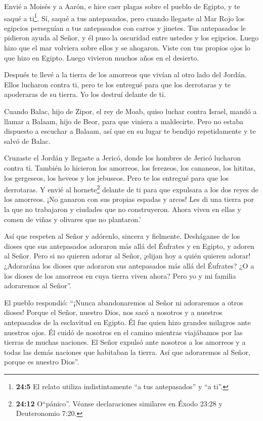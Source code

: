  Envié a Moisés y a Aarón, e hice caer plagas sobre el
pueblo de Egipto, y te saqué a ti\footnote{\textbf{24:5} El relato
  utiliza indistintamente ``a tus antepasados'' y ``a ti''.}.
 Sí, saqué a tus antepasados, pero cuando llegaste al Mar
Rojo los egipcios perseguían a tus antepasados con carros y jinetes.
 Tus antepasados le pidieron ayuda al Señor, y él puso la
oscuridad entre ustedes y los egipcios. Luego hizo que el mar volviera
sobre ellos y se ahogaron. Viste con tus propios ojos lo que hizo en
Egipto. Luego vivieron muchos años en el desierto.

 Después te llevé a la tierra de los amorreos que vivían al
otro lado del Jordán. Ellos lucharon contra ti, pero te los entregué
para que los derrotaras y te apoderaras de su tierra. Yo los destruí
delante de ti.

 Cuando Balac, hijo de Zipor, el rey de Moab, quiso luchar
contra Israel, mandó a llamar a Balaam, hijo de Beor, para que viniera a
maldecirte.  Pero no estaba dispuesto a escuchar a Balaam,
así que en su lugar te bendijo repetidamente y te salvó de Balac.

 Cruzaste el Jordán y llegaste a Jericó, donde los hombres
de Jericó lucharon contra ti. También lo hicieron los amorreos, los
ferezeos, los cananeos, los hititas, los gergeseos, los heveos y los
jebuseos.  Pero te los entregué para que los derrotaras. Y
envié al hornete\footnote{\textbf{24:12} O``pánico''. Véanse
  declaraciones similares en Éxodo 23:28 y Deuteronomio 7:20.} delante
de ti para que expulsara a los dos reyes de los amorreos. ¡No ganaron
con sus propias espadas y arcos!  Les di una tierra por la
que no trabajaron y ciudades que no construyeron. Ahora viven en ellas y
comen de viñas y olivares que no plantaron.'

 Así que respeten al Señor y adórenlo, sincera y fielmente.
Desháganse de los dioses que sus antepasados adoraron más allá del
Éufrates y en Egipto, y adoren al Señor.  Pero si no
quieren adorar al Señor, ¡elijan hoy a quién quieren adorar! ¿Adorarána
los dioses que adoraron sus antepasados más allá del Éufrates? ¿O a los
dioses de los amorreos en cuya tierra viven ahora? Pero yo y mi familia
adoraremos al Señor''.

 El pueblo respondió: ``¡Nunca abandonaremos al Señor ni
adoraremos a otros dioses!  Porque el Señor, nuestro Dios,
nos sacó a nosotros y a nuestros antepasados de la esclavitud en Egipto.
Él fue quien hizo grandes milagros ante nuestros ojos. Él cuidó de
nosotros en el camino mientras viajábamos por las tierras de muchas
naciones.  El Señor expulsó ante nosotros a los amorreos y
a todas las demás naciones que habitaban la tierra. Así que adoraremos
al Señor, porque es nuestro Dios''.

